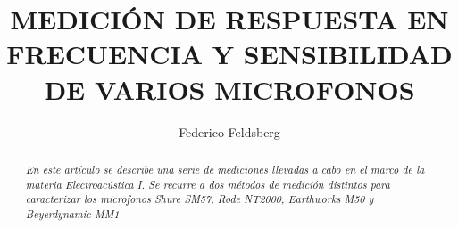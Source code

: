 \documentclass[]{article}
\title{\textbf{\LARGE{\textsf{MEDICIÓN DE RESPUESTA EN FRECUENCIA Y
 SENSIBILIDAD DE VARIOS MICROFONOS}}}}
\date{} %
\begin{document}


\renewcommand{\headrulewidth}{0pt} %


\author[1]{Federico Feldsberg} %


\begin{minipage}[h]{\textwidth} %
    \maketitle
    \thispagestyle{fancy}
    \fancyhf{}
    \rhead{\today}
    \cfoot{\thepage}

\end{minipage}


\begin{abstract}
\textit{En este artículo se describe una serie de mediciones llevadas a cabo
en el marco de la materia Electroacústica I. Se recurre a dos métodos
de medición distintos para caracterizar los microfonos Shure SM57,
Rode NT2000, Earthworks M50 y Beyerdynamic MM1}
\end{abstract}
\end{document}
